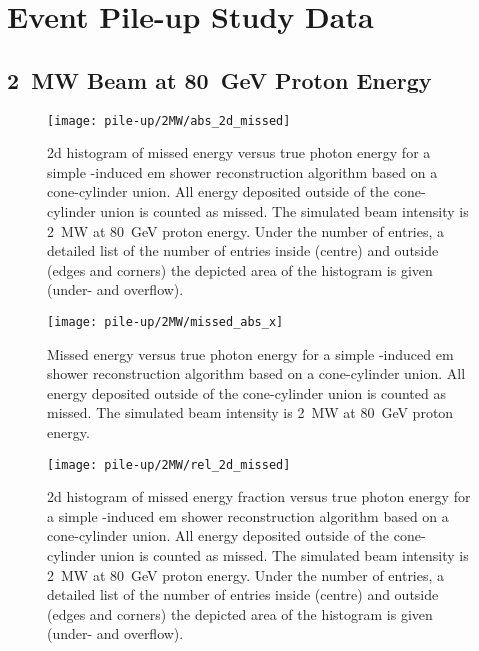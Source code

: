 \chapter{  Event Pile-up Study Data}
\label{chap:pile-up-data}

\section{\SI{2}{\mega\watt} Beam at \SI{80}{\giga\electronvolt} Proton Energy}

\begin{figure}[htb]
	\centering
	\texttt{[image: pile-up/2MW/abs\_2d\_missed]}
	\caption{\gls{2d} histogram of missed energy versus true photon energy for a simple \Pgpz-induced \gls{em} shower reconstruction algorithm based on a cone-cylinder union.
		All energy deposited outside of the cone-cylinder union is counted as missed.
		The simulated beam intensity is \SI{2}{\mega\watt} at \SI{80}{\giga\electronvolt} proton energy.
		Under the number of entries, a detailed list of the number of entries inside (centre) and outside (edges and corners) the depicted area of the histogram is given (under- and overflow).}
\end{figure}

\begin{figure}[htb]
	\centering
	\texttt{[image: pile-up/2MW/missed\_abs\_x]}
	\caption{Missed energy versus true photon energy for a simple \Pgpz-induced \gls{em} shower reconstruction algorithm based on a cone-cylinder union.
		All energy deposited outside of the cone-cylinder union is counted as missed.
		The simulated beam intensity is \SI{2}{\mega\watt} at \SI{80}{\giga\electronvolt} proton energy.}
\end{figure}

\begin{figure}[htb]
	\centering
	\texttt{[image: pile-up/2MW/rel\_2d\_missed]}
	\caption{\gls{2d} histogram of missed energy fraction versus true photon energy for a simple \Pgpz-induced \gls{em} shower reconstruction algorithm based on a cone-cylinder union.
		All energy deposited outside of the cone-cylinder union is counted as missed.
		The simulated beam intensity is \SI{2}{\mega\watt} at \SI{80}{\giga\electronvolt} proton energy.
		Under the number of entries, a detailed list of the number of entries inside (centre) and outside (edges and corners) the depicted area of the histogram is given (under- and overflow).}
\end{figure}

